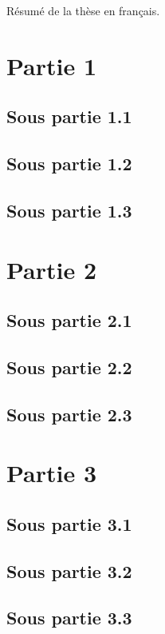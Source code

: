 \begin{resume_fr}

Résumé de la thèse en français.

\section*{Partie 1}
\subsection*{Sous partie 1.1}
\subsection*{Sous partie 1.2}
\subsection*{Sous partie 1.3}

\section*{Partie 2}
\subsection*{Sous partie 2.1}
\subsection*{Sous partie 2.2}
\subsection*{Sous partie 2.3}

\section*{Partie 3}
\subsection*{Sous partie 3.1}
\subsection*{Sous partie 3.2}
\subsection*{Sous partie 3.3}



\end{resume_fr}
